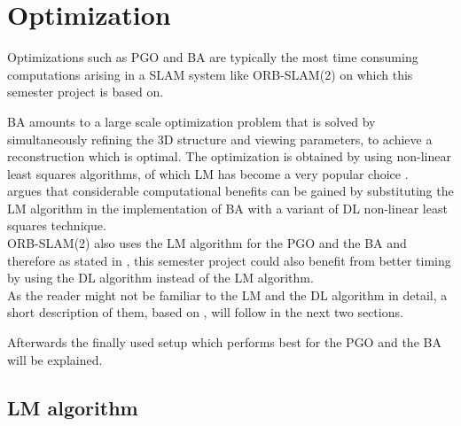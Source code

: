 \chapter{Optimization}
\label{sec:optimization}

Optimizations such as \acf{PGO} and \acf{BA} are typically the most time consuming computations arising in a \ac{SLAM} system like ORB-SLAM(2) \cite{Mur-Artal2015,Mur-Artal2016} on which this semester project is based on.

\ac{BA} amounts to a large scale optimization problem that is solved by simultaneously refining the 3D structure and viewing parameters, to achieve a reconstruction which is optimal. The optimization is obtained by using non-linear least squares algorithms, of which \acf{LM} has become a very popular choice \cite{Lourakis2005}.\\

\cite{Lourakis2005} argues that considerable computational benefits can be gained by substituting the \ac{LM} algorithm in the implementation of \ac{BA} with a variant of \acf{DL} non-linear least squares technique.\\

ORB-SLAM(2) also uses the \ac{LM} algorithm for the \ac{PGO} and the \ac{BA} and therefore as stated in \cite{Lourakis2005}, this semester project could also benefit from better timing by using the \ac{DL} algorithm instead of the \ac{LM} algorithm.\\

As the reader might not be familiar to the \ac{LM} and the \ac{DL} algorithm in detail, a short description of them, based on \cite{Lourakis2005}, will follow in the next two sections.

Afterwards the finally used setup which performs best for the \ac{PGO} and the \ac{BA} will be explained.

\section{\acf{LM} algorithm} 

